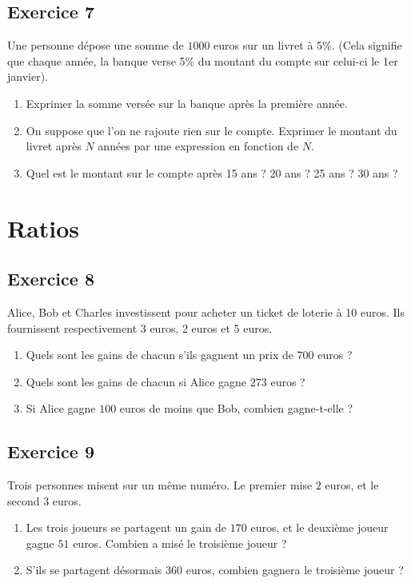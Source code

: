 \documentclass[12 pt]{extarticle}
\theoremstyle{plain}
\begin{document}
\subsection*{Exercice 7}

Une personne dépose une somme de $1000$ euros sur un livret à 5\%. (Cela signifie que chaque année, la banque verse 5\% du montant du compte sur celui-ci le 1er janvier).

\begin{enumerate}
\item Exprimer la somme versée sur la banque après la première année. 
\item On suppose que l'on ne rajoute rien sur le compte. Exprimer le montant du livret après $N$ années par une expression en fonction de $N$. 
\item Quel est le montant sur le compte après 15 ans ? 20 ans ? 25 ans ? 30 ans ?

\end{enumerate}

\section{Ratios}

\subsection*{Exercice 8}

Alice, Bob et Charles investissent pour acheter un ticket de loterie à 10 euros. Ils fournissent respectivement 3 euros, 2 euros et 5 euros. 
\begin{enumerate}
\item Quels sont les gains de chacun s'ils gagnent un prix de 700 euros ?
\item Quels sont les gains de chacun si Alice gagne $273$ euros ? 
\item Si Alice gagne $100$ euros de moins que Bob, combien gagne-t-elle ? 
\end{enumerate}


\subsection*{Exercice 9}

Trois personnes misent sur un même numéro. Le premier mise $2$ euros, et le second $3$ euros. 
\begin{enumerate}
\item Les trois joueurs se partagent un gain de $170$ euros, et le deuxième joueur gagne $51$ euros. Combien a misé le troisième joueur ? 
\item S'ils se partagent désormais $360$ euros, combien gagnera le troisième joueur ? 
\end{enumerate}
\end{document}
